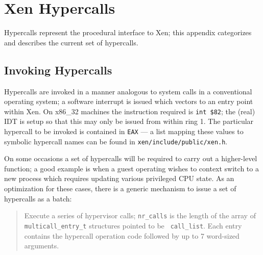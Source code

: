 \documentclass[11pt,twoside,final,openright]{xenstyle}
\begin{document}
\appendix






\newcommand{\hypercall}[1]{\vspace{2mm}{\sf #1}}



\hypercall{physdev\_op(void *physdev\_op)}


\hypercall{vm\_assist(unsigned int cmd, unsigned int type)}




\chapter{Xen Hypercalls}
\label{a:hypercalls}

Hypercalls represent the procedural interface to Xen; this appendix 
categorizes and describes the current set of hypercalls. 

\section{Invoking Hypercalls} 

Hypercalls are invoked in a manner analogous to system calls in a
conventional operating system; a software interrupt is issued which
vectors to an entry point within Xen. On x86\_32 machines the
instruction required is {\tt int \$82}; the (real) IDT is setup so
that this may only be issued from within ring 1. The particular 
hypercall to be invoked is contained in {\tt EAX} --- a list 
mapping these values to symbolic hypercall names can be found 
in {\tt xen/include/public/xen.h}. 

On some occasions a set of hypercalls will be required to carry
out a higher-level function; a good example is when a guest 
operating wishes to context switch to a new process which 
requires updating various privileged CPU state. As an optimization
for these cases, there is a generic mechanism to issue a set of 
hypercalls as a batch: 

\begin{quote}
\hypercall{multicall(void *call\_list, int nr\_calls)}

Execute a series of hypervisor calls; {\tt nr\_calls} is the length of
the array of {\tt multicall\_entry\_t} structures pointed to be {\tt
call\_list}. Each entry contains the hypercall operation code followed
by up to 7 word-sized arguments.
\end{quote}
\end{document}
